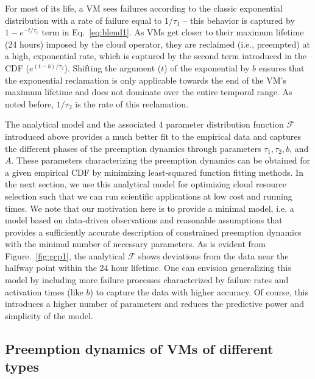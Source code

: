 For most of its life, a VM sees failures according to the classic exponential distribution with a rate of failure equal to $1/\tau_1$ -- this behavior is captured by $1-e^{-t/\tau_1}$ term in Eq.~\ref{eq:blend1}. 
As VMs get closer to their maximum lifetime (24 hours) imposed by the cloud operator, they are reclaimed (i.e., preempted) at a high, exponential rate, which is captured by the second term introduced in the CDF ($e^{(t-b)/\tau_2}$). 
Shifting the argument ($t$) of the exponential by $b$ ensures that the exponential reclamation is only applicable towards the end of the VM's maximum lifetime and does not dominate over the entire temporal range. As noted before, $1/\tau_2$ is the rate of this reclamation.

The analytical model and the associated 4 parameter distribution function $\mathscr{F}$ introduced above provides a much better fit to the empirical data and captures the different phases of the preemption dynamics through parameters $\tau_1, \tau_2, b$, and $A$. These parameters characterizing the preemption dynamics can be obtained for a given empirical CDF by minimizing least-squared function fitting methods. \footnotemark 
%
%
In the next section, we use this analytical model for optimizing cloud resource selection such that we can run scientific applications at low cost and running times. We note that our motivation here is to provide a minimal model, i.e. a model based on data-driven observations and reasonable assumptions that provides a sufficiently accurate description of constrained preemption dynamics with the minimal number of necessary parameters. As is evident from Figure.~\ref{fig:gcp1}, the analytical $\mathscr{F}$ shows deviations from the data near the halfway point within the 24 hour lifetime. One can envision generalizing this model by including more failure processes characterized by failure rates and activation times (like $b$) to capture the data with higher accuracy. Of course, this introduces a higher number of parameters and reduces the predictive power and simplicity of the model. 


\subsection{Preemption dynamics of VMs of different types}

